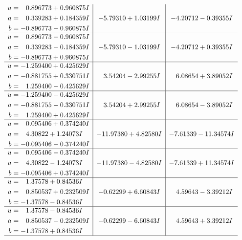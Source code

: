 \documentclass[1p]{elsarticle_modified}
\theoremstyle{definition}
\begin{document}
$$\begin{array}{c|c|c}
\begin{aligned}
u &= \phantom{-}0.896773 + 0.960875 I \\
a &= \phantom{-}0.339283 + 0.184359 I \\
b &= -0.896773 - 0.960875 I\end{aligned}
 & -5.79310 + 1.03199 I & -4.20712 - 0.39355 I \\ \hline\begin{aligned}
u &= \phantom{-}0.896773 - 0.960875 I \\
a &= \phantom{-}0.339283 - 0.184359 I \\
b &= -0.896773 + 0.960875 I\end{aligned}
 & -5.79310 - 1.03199 I & -4.20712 + 0.39355 I \\ \hline\begin{aligned}
u &= -1.259400 + 0.425629 I \\
a &= -0.881755 + 0.330751 I \\
b &= \phantom{-}1.259400 - 0.425629 I\end{aligned}
 & \phantom{-}3.54204 - 2.99255 I & \phantom{-}6.08654 + 3.89052 I \\ \hline\begin{aligned}
u &= -1.259400 - 0.425629 I \\
a &= -0.881755 - 0.330751 I \\
b &= \phantom{-}1.259400 + 0.425629 I\end{aligned}
 & \phantom{-}3.54204 + 2.99255 I & \phantom{-}6.08654 - 3.89052 I \\ \hline\begin{aligned}
u &= \phantom{-}0.095406 + 0.374240 I \\
a &= \phantom{-}4.30822 + 1.24073 I \\
b &= -0.095406 - 0.374240 I\end{aligned}
 & -11.97380 + 4.82580 I & -7.61339 - 11.34574 I \\ \hline\begin{aligned}
u &= \phantom{-}0.095406 - 0.374240 I \\
a &= \phantom{-}4.30822 - 1.24073 I \\
b &= -0.095406 + 0.374240 I\end{aligned}
 & -11.97380 - 4.82580 I & -7.61339 + 11.34574 I \\ \hline\begin{aligned}
u &= \phantom{-}1.37578 + 0.84536 I \\
a &= \phantom{-}0.850537 + 0.232509 I \\
b &= -1.37578 - 0.84536 I\end{aligned}
 & -0.62299 + 6.60843 I & \phantom{-}4.59643 - 3.39212 I \\ \hline\begin{aligned}
u &= \phantom{-}1.37578 - 0.84536 I \\
a &= \phantom{-}0.850537 - 0.232509 I \\
b &= -1.37578 + 0.84536 I\end{aligned}
 & -0.62299 - 6.60843 I & \phantom{-}4.59643 + 3.39212 I\\
 \hline 
 \end{array}$$\newpage\newpage\renewcommand{\arraystretch}{1}
\end{document}
